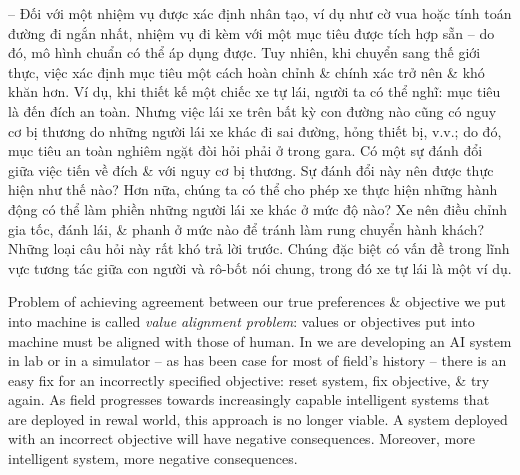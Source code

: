 \documentclass{article}
\begin{document}
\begin{itemize}
\begin{itemize}
\begin{itemize}
\begin{itemize}
				-- Đối với một nhiệm vụ được xác định nhân tạo, ví dụ như cờ vua hoặc tính toán đường đi ngắn nhất, nhiệm vụ đi kèm với một mục tiêu được tích hợp sẵn -- do đó, mô hình chuẩn có thể áp dụng được. Tuy nhiên, khi chuyển sang thế giới thực, việc xác định mục tiêu một cách hoàn chỉnh \& chính xác trở nên \& khó khăn hơn. Ví dụ, khi thiết kế một chiếc xe tự lái, người ta có thể nghĩ: mục tiêu là đến đích an toàn. Nhưng việc lái xe trên bất kỳ con đường nào cũng có nguy cơ bị thương do những người lái xe khác đi sai đường, hỏng thiết bị, v.v.; do đó, mục tiêu an toàn nghiêm ngặt đòi hỏi phải ở trong gara. Có một sự đánh đổi giữa việc tiến về đích \& với nguy cơ bị thương. Sự đánh đổi này nên được thực hiện như thế nào? Hơn nữa, chúng ta có thể cho phép xe thực hiện những hành động có thể làm phiền những người lái xe khác ở mức độ nào? Xe nên điều chỉnh gia tốc, đánh lái, \& phanh ở mức nào để tránh làm rung chuyển hành khách? Những loại câu hỏi này rất khó trả lời trước. Chúng đặc biệt có vấn đề trong lĩnh vực tương tác giữa con người và rô-bốt nói chung, trong đó xe tự lái là một ví dụ.
				
				Problem of achieving agreement between our true preferences \& objective we put into machine is called {\it value alignment problem}: values or objectives put into machine must be aligned with those of human. In we are developing an AI system in lab or in a simulator -- as has been case for most of field's history -- there is an easy fix for an incorrectly specified objective: reset system, fix objective, \& try again. As field progresses towards increasingly capable intelligent systems that are deployed in rewal world, this approach is no longer viable. A system deployed with an incorrect objective will have negative consequences. Moreover, more intelligent system, more negative consequences.
				

\end{itemize}
\end{itemize}
\end{itemize}
\end{itemize}
\end{document}
